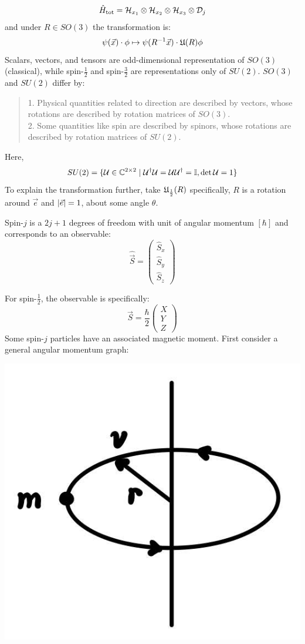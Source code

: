 $$\hat{H}_{\text{tot}} = \mathcal{H}_{x_1} \otimes \mathcal{H}_{x_2} \otimes \mathcal{H}_{x_3} \otimes \mathcal{D}_j$$
and under $R \in SO(3)$ the transformation is:
$$\psi(\vec{x}) \cdot \phi \mapsto \psi(R^{-1}\vec{x}) \cdot \mathfrak{U}(R)\phi$$
Scalars, vectors, and tensors are odd-dimensional representation of $SO(3)$ (classical), while spin-$\frac{1}{2}$ and spin-$\frac{3}{2}$ are representations only of $SU(2)$. $SO(3)$ and $SU(2)$ differ by:
\begin{quote}
    1. Physical quantities related to direction are described by vectors, whose rotations are described by rotation matrices of $SO(3)$. \\
    2. Some quantities like spin are described by spinors, whose rotations are described by rotation matrices of $SU(2)$.
\end{quote}
Here,
$$SU(2) = \{\mathcal{U} \in \mathbb{C}^{2 \times 2} \mid \mathcal{U}^{\dagger}\mathcal{U} = \mathcal{U}\mathcal{U}^{\dagger} = \mathbb{I}, \det\mathcal{U} = 1\}$$
To explain the transformation further, take $\mathfrak{U}_{\frac{1}{2}}(R)$ specifically, $R$ is a rotation around $\vec{e}$ and $\abs{\vec{e}} = 1$, about some angle $\theta$.
\begin{definition}
    Spin-$j$ is a $2j+1$ degrees of freedom with unit of angular momentum $[\hbar]$ and corresponds to an observable:
    $$\hat{\vec{S}} = \begin{pmatrix}
        \hat{S}_x \\ \hat{S}_y \\ \hat{S}_z
    \end{pmatrix}$$
\end{definition}
For spin-$\frac{1}{2}$, the observable is specifically:
$$\hat{\vec{S}} = \frac{\hbar}{2}\begin{pmatrix}
    X \\ Y \\ Z
\end{pmatrix}$$
Some spin-$j$ particles have an associated magnetic moment. First consider a general angular momentum graph:
\begin{center}
    \includegraphics[scale = 0.25]{spin-angular-mtm.jpg}
\end{center}

